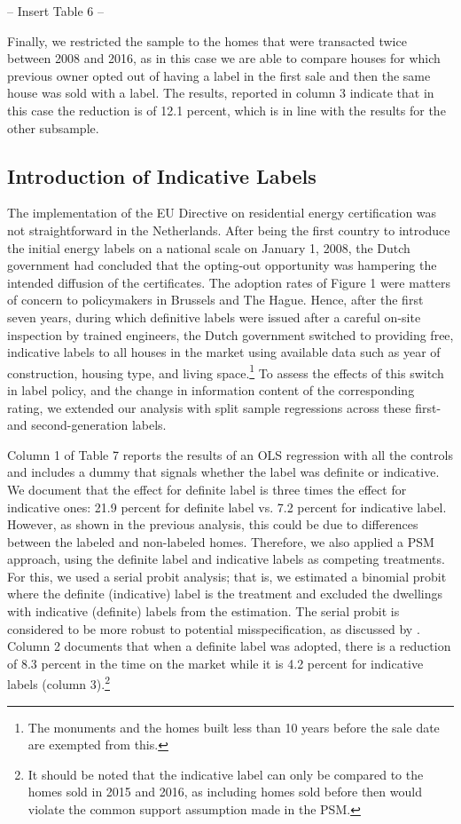 \documentclass[12pt]{article}
\begin{document}
\begin{center}
-- Insert Table 6 --
\end{center}

Finally, we restricted the sample to the homes that were transacted twice between 2008 and 2016, as in this case we are able to compare houses for which previous owner opted out of having a label in the first sale and then the same house was sold with a label. The results, reported in column 3 indicate that in this case the reduction is of 12.1 percent, which is in line with the results for the other subsample.

\subsection{Introduction of Indicative Labels}

The implementation of the EU Directive on residential energy certification was not straightforward in the Netherlands. After being the first country to introduce the initial energy labels on a national scale on January 1, 2008, the Dutch government had concluded that the opting-out opportunity was hampering the intended diffusion of the certificates. The adoption rates of Figure 1 were matters of concern to policymakers in Brussels and The Hague. Hence, after the first seven years, during which definitive labels were issued after a careful on-site inspection by trained engineers, the Dutch government switched to providing free, indicative labels to all houses in the market using available data such as year of construction, housing type, and living space.\footnote{The monuments and the homes built less than 10 years before the sale date are exempted from this.}  To assess the effects of this switch in label policy, and the change in information content of the corresponding rating, we extended our analysis with split sample regressions across these first- and second-generation labels. 

Column 1 of Table 7 reports the results of an OLS regression with all the controls and includes a dummy that signals whether the label was definite or indicative. We document that the effect for definite label is three times the effect for indicative ones: 21.9 percent for definite label vs. 7.2 percent for indicative label. However, as shown in the previous analysis, this could be due to differences between the labeled and non-labeled homes. Therefore, we also applied a PSM approach, using the definite label and indicative labels as competing treatments. For this, we used a serial probit analysis; that is, we estimated a binomial probit where the definite (indicative) label is the treatment and excluded the dwellings with indicative (definite) labels from the estimation. The serial probit is considered to be more robust to potential misspecification, as discussed by \cite{caliendo2008some}. Column 2 documents that when a definite label was adopted, there is a reduction of 8.3 percent in the time on the market while it is 4.2 percent for indicative labels (column 3).\footnote{It should be noted that the indicative label can only be compared to the homes sold in 2015 and 2016, as including homes sold before then would violate the common support assumption made in the PSM.}
\end{document}
